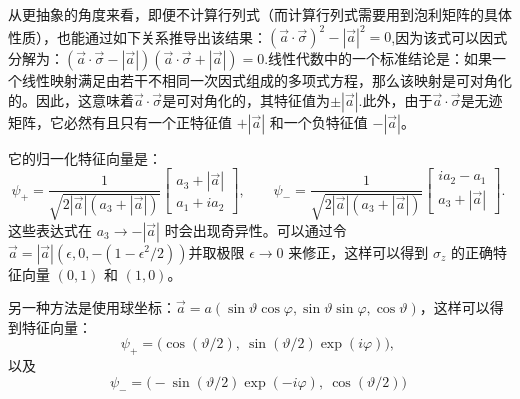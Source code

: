 从更抽象的角度来看，即便不计算行列式（而计算行列式需要用到泡利矩阵的具体性质），也能通过如下关系推导出该结果：$(\vec{a} \cdot \vec{\sigma})^2 - |\vec{a}|^2 = 0$,因为该式可以因式分解为：$(\vec{a} \cdot \vec{\sigma} - |\vec{a}|)(\vec{a} \cdot \vec{\sigma} + |\vec{a}|) = 0$.线性代数中的一个标准结论是：如果一个线性映射满足由若干不相同一次因式组成的多项式方程，那么该映射是可对角化的。因此，这意味着$\vec{a} \cdot \vec{\sigma}$是可对角化的，其特征值为$\pm |\vec{a}|$.此外，由于$\vec{a} \cdot \vec{\sigma}$是无迹矩阵，它必然有且只有一个正特征值 $+|\vec{a}|$ 和一个负特征值 $-|\vec{a}|$。

它的归一化特征向量是：
$$
\psi_{+} = 
\frac{1}{\sqrt{2\left|{\vec{a}}\right|\left(a_3+\left|{\vec{a}}\right|\right)}} 
\begin{bmatrix}
a_3 + \left|{\vec{a}}\right| \\
a_1 + i a_2
\end{bmatrix},
\qquad
\psi_{-} =
\frac{1}{\sqrt{2\left|{\vec{a}}\right|\left(a_3+\left|{\vec{a}}\right|\right)}} 
\begin{bmatrix}
i a_2 - a_1 \\
a_3 + \left|{\vec{a}}\right|
\end{bmatrix}.~
$$
这些表达式在 $a_3 \to -|{\vec{a}}|$ 时会出现奇异性。可以通过令${\vec{a}} = |{\vec{a}}|(\epsilon, 0, -(1-\epsilon^2/2))$并取极限 $\epsilon \to 0$ 来修正，这样可以得到 $\sigma_z$ 的正确特征向量 $(0,1)$ 和 $(1,0)$。

另一种方法是使用球坐标：${\vec{a}} = a(\sin\vartheta\cos\varphi, \sin\vartheta\sin\varphi, \cos\vartheta)$，这样可以得到特征向量：
$$
\psi_+ = \big(\cos(\vartheta/2), \ \sin(\vartheta/2)\exp(i\varphi)\big),~
$$
以及
$$
\psi_- = \big(-\sin(\vartheta/2)\exp(-i\varphi), \ \cos(\vartheta/2)\big)~
$$
